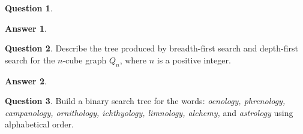 \documentclass[article, 12pt]{article}
\theoremstyle{definition}
\newtheorem{question}{Question}
\newtheorem{answer}{Answer}
\begin{document}
\begin{question}
\begin{figure}[H]
        \end{figure}
    \end{question}

    \begin{answer}
        \label{a6}
    \end{answer}

    \begin{question}
        \label{q7}
        Describe the tree produced by breadth-first search and depth-first search for the $n$-cube graph $Q_n$, where $n$ is a positive integer.
    \end{question}

    \begin{answer}
        \label{a7}
    \end{answer}

    \begin{question}
        \label{q8}
        Build a binary search tree for the words: {\em oenology, phrenology, campanology, ornithology, ichthyology, limnology, alchemy,} and {\em astrology} using alphabetical order.   
     \end{question}
\end{document}
